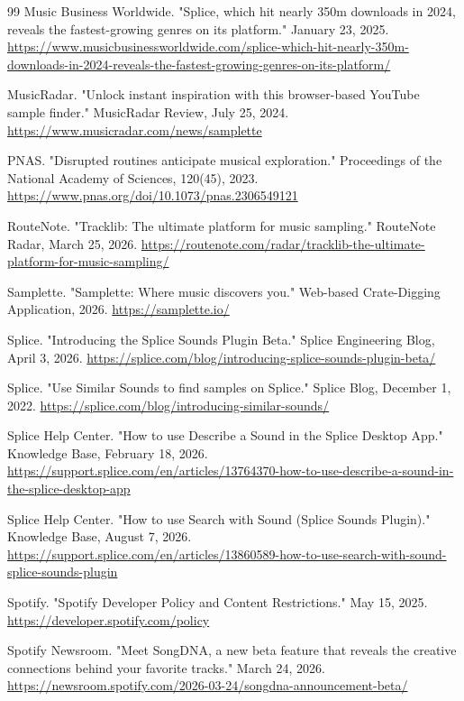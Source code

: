 \begin{thebibliography}{99}
  Music Business Worldwide.
  "Splice, which hit nearly 350m downloads in 2024, reveals the fastest-growing genres on its platform."
  January 23, 2025. \url{https://www.musicbusinessworldwide.com/splice-which-hit-nearly-350m-downloads-in-2024-reveals-the-fastest-growing-genres-on-its-platform/}

  MusicRadar.
  "Unlock instant inspiration with this browser-based YouTube sample finder."
  MusicRadar Review, July 25, 2024. \url{https://www.musicradar.com/news/samplette}

  PNAS.
  "Disrupted routines anticipate musical exploration."
  Proceedings of the National Academy of Sciences, 120(45), 2023. \url{https://www.pnas.org/doi/10.1073/pnas.2306549121}

  RouteNote.
  "Tracklib: The ultimate platform for music sampling."
  RouteNote Radar, March 25, 2026. \url{https://routenote.com/radar/tracklib-the-ultimate-platform-for-music-sampling/}

  Samplette.
  "Samplette: Where music discovers you."
  Web-based Crate-Digging Application, 2026. \url{https://samplette.io/}

  Splice.
  "Introducing the Splice Sounds Plugin Beta."
  Splice Engineering Blog, April 3, 2026. \url{https://splice.com/blog/introducing-splice-sounds-plugin-beta/}

  Splice.
  "Use Similar Sounds to find samples on Splice."
  Splice Blog, December 1, 2022. \url{https://splice.com/blog/introducing-similar-sounds/}

  Splice Help Center.
  "How to use Describe a Sound in the Splice Desktop App."
  Knowledge Base, February 18, 2026. \url{https://support.splice.com/en/articles/13764370-how-to-use-describe-a-sound-in-the-splice-desktop-app}

  Splice Help Center.
  "How to use Search with Sound (Splice Sounds Plugin)."
  Knowledge Base, August 7, 2026. \url{https://support.splice.com/en/articles/13860589-how-to-use-search-with-sound-splice-sounds-plugin}

  Spotify.
  "Spotify Developer Policy and Content Restrictions."
  May 15, 2025. \url{https://developer.spotify.com/policy}

  Spotify Newsroom.
  "Meet SongDNA, a new beta feature that reveals the creative connections behind your favorite tracks."
  March 24, 2026. \url{https://newsroom.spotify.com/2026-03-24/songdna-announcement-beta/}


\end{thebibliography}
